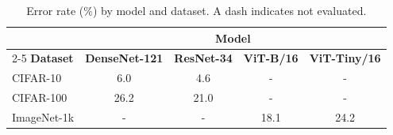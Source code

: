 \begin{table}[t]
\centering
\caption{Error rate (\%) by model and dataset. A dash indicates not evaluated.}
\label{tab:average_error}
\begin{tabular}{lcccc}
\toprule
& \multicolumn{4}{c}{\textbf{Model}} \\
\cmidrule(lr){2-5}
\textbf{Dataset} & \textbf{DenseNet-121} & \textbf{ResNet-34} & \textbf{ViT-B/16} & \textbf{ViT-Tiny/16} \\
\midrule
CIFAR-10   &  6.0 &  4.6 & -    & -    \\
CIFAR-100  & 26.2 & 21.0 & -    & -    \\
ImageNet-1k&  -   &  -  & 18.1 & 24.2 \\
\bottomrule
\end{tabular}
\end{table}